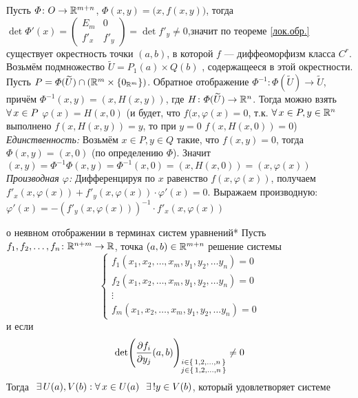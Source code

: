 \begin{prf}
	Пусть $\varPhi \colon O \to \mathbb R^{m+n}$\!, $\varPhi(x, y) = \bigl(x, f(x, y)\bigr)$, тогда $\det \varPhi'(x) = \! \begin{pmatrix}
		\! E_m & 0 \\ \! f'_x & f'_y
	\end{pmatrix}\! = \det f'_y \ne 0$,\linebreak значит по теореме \ref{лок.обр.} существует окрестность точки $(a, b)$, в которой $f$ --- диффеоморфизм класса $C^r$. Возьмём подмножество $\widetilde U = P_1(a) \times Q(b)$ , содержащееся в этой окрестности. Пусть $P = \varPhi(\widetilde U) \cap (\mathbb R^m \times \{0_{\mathbb R^m}\})$. Обратное отображение $\varPhi^{-1} \colon \varPhi(\widetilde U) \to \widetilde U$, причём $\varPhi^{-1}(x, y) = (x, H(x, y))$, где $H \colon \varPhi(\widetilde U) \to \mathbb R^n$. Тогда можно взять $\forall \, x \in P$ $\varphi(x) = H(x, 0)$ (и будет, что $f(x, \varphi (x) = 0$, т.к. $\forall \, x \in P, y \in \mathbb R^n $ выполнено $f(x, H(x, y)) = y$, то при $y = 0$ $f(x, H(x, 0)) = 0$)\\
	\textit{Единственность:} Возьмём $x \in P, y \in Q$ такие, что $f(x, y) = 0$, тогда $\varPhi(x, y) = (x, 0)$ (по определению $\varPhi$). Значит $(x, y) = \varPhi^{-1}\varPhi(x, y) = \varPhi^{-1}(x, 0) = (x, H(x, 0)) = (x, \varphi(x))$\\
	\textit{Производная $\varphi$:} Дифференцируя по $x$ равенство $f(x, \varphi(x))$, получаем $f'_x(x, \varphi(x)) + f'_y(x, \varphi(x)) \cdot \varphi'(x) = 0$. Выражаем производную: $\varphi'(x) = -(f'_y(x, \varphi(x)))^{-1} \cdot f'_x(x, \varphi(x))$
\end{prf}

\begin{teor}[https://www.youtube.com/live/g4Zgeu8xe-Q?si=_tKOk_xr6R14Qeqi&t=3716]{о неявном отображении в терминах систем уравнений}*\label{неявн.отобр.сист.}
	Пусть $f_1, f_2, \ldots, f_n \colon \mathbb R^{n + m} \to \mathbb R$, точка $(a, b) \in \mathbb R^{m + n}$ решение системы 
	\[\begin{cases}
		f_1(x_1, x_2, \ldots, x_m, y_1, y_2, \ldots y_n) = 0\\
		f_2(x_1, x_2, \ldots, x_m, y_1, y_2, \ldots y_n) = 0\\
		\vdots\\
		f_m(x_1, x_2, \ldots, x_m, y_1, y_2, \ldots y_n) = 0
	\end{cases}\]
	и если
	\[\det \Biggl(\frac{\partial f_i}{\partial y_j} (a, b)\Biggr)_{\substack{i \in \{\,1, 2, \ldots, n \, \} \\ j \in \{\,1, 2, \ldots, n \, \}}} \ne 0\]
	Тогда$\E U(a), V(b) : \A x \in U(a) \E ! y \in V(b)$, который удовлетворяет системе
\end{teor}